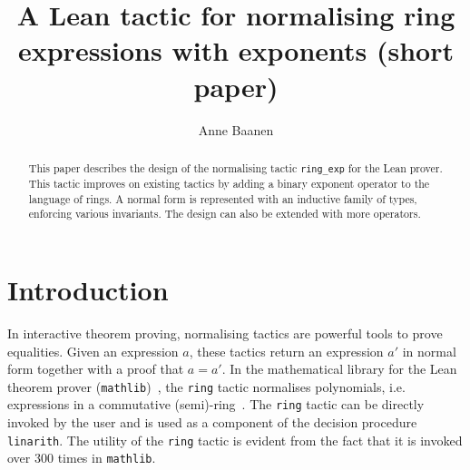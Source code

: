\documentclass{llncs}
\title{A Lean tactic for normalising ring\\ expressions with exponents (short paper)}
\author{Anne Baanen}
\institute{Vrije Universiteit Amsterdam, Netherlands\\\email{t.baanen@vu.nl}}
\newcommand{\lean}[1]{\texttt{#1}\xspace} %
\newcommand{\ring}{\lean{ring}}
\newcommand{\ringexp}{\lean{ring\_exp}}
\begin{document}
\maketitle

\begin{abstract}
This paper describes the design of the normalising tactic \ringexp for the Lean prover.
This tactic improves on existing tactics by adding a binary exponent operator to the language of rings.
A normal form is represented with an inductive family of types, enforcing various invariants.
The design can also be extended with more operators.
\end{abstract}

\section{Introduction}

In interactive theorem proving, normalising tactics are powerful tools to prove equalities.
Given an expression $a$, these tactics return an expression $a'$ in normal form together with a proof that $a = a'$.
In the mathematical library for the Lean theorem prover (\texttt{mathlib})~\cite{lean-prover},
the \lean{ring} tactic normalises polynomials, i.e. expressions in a commutative (semi)-ring~\cite{mathlib}.
The \ring tactic can be directly invoked by the user
and is used as a component of the decision procedure \lean{linarith}.
The utility of the \lean{ring} tactic is evident from the fact that it is invoked over 300 times in \texttt{mathlib}.
\end{document}
